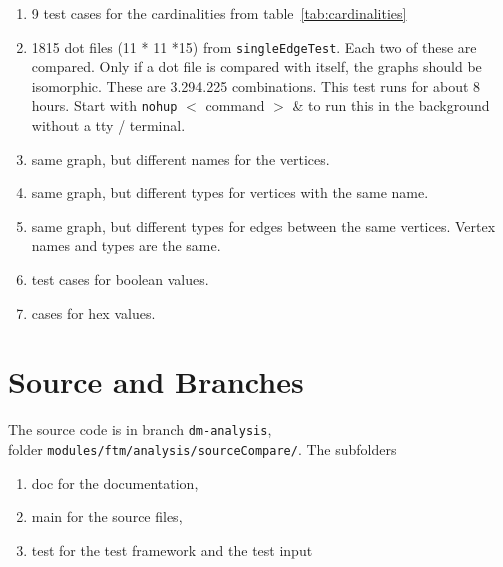 \documentclass[12pt,a4paper]{report}
\begin{document}
\begin{enumerate}
  \item 9 test cases for the cardinalities from table~\ref{tab:cardinalities}
  \item 1815 dot files (11 * 11 *15) from \texttt{singleEdgeTest}. Each two of these are compared. Only if a dot file is compared with itself, the graphs should be isomorphic. These are 3.294.225 combinations.
This test runs for about 8 hours. Start with \texttt{nohup} $<$ command $>$ \& to run this in the background without a tty / terminal.
  \item same graph, but different names for the vertices.
  \item same graph, but different types for vertices with the same name.
  \item same graph, but different types for edges between the same vertices. Vertex names and types are the same.
  \item test cases for boolean values.
  \item cases for hex values.
\end{enumerate}

\chapter{Source and Branches}
The source code is in branch \texttt{dm-analysis}, \\ 
folder \texttt{modules/ftm/analysis/sourceCompare/}. The subfolders
\begin{enumerate}
  \item doc for the documentation,
  \item main for the source files,
  \item test for the test framework and the test input
\end{enumerate}
\end{document}
